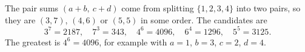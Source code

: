 The pair sums $(a+b,\ c+d)$ come from splitting $\{1,2,3,4\}$ into two pairs, so they are $(3,7)$, $(4,6)$ or $(5,5)$ in some order. The candidates are
\[3^7=2187,\quad 7^3=343,\quad 4^6=4096,\quad 6^4=1296,\quad 5^5=3125 .\]
The greatest is $4^6=\boxed{4096}$, for example with $a=1$, $b=3$, $c=2$, $d=4$.
